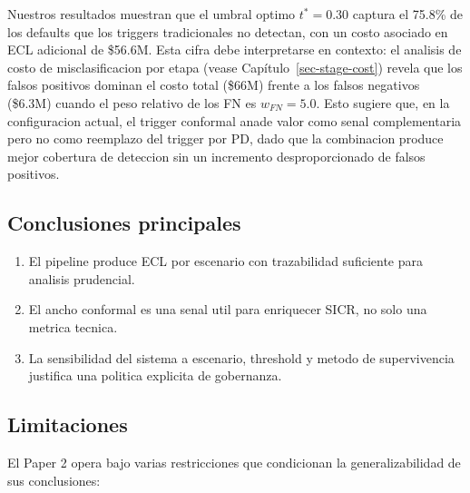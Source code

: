 \documentclass[
  spanish,
  11pt,
  letterpaper,
]{scrbook}
\providecommand{\tightlist}{%
  \setlength{\itemsep}{0pt}\setlength{\parskip}{0pt}}
\theoremstyle{plain}
\theoremstyle{remark}
\begin{document}
Nuestros resultados muestran que el umbral optimo \(t^* = 0.30\) captura
el 75.8\% de los defaults que los triggers tradicionales no detectan,
con un costo asociado en ECL adicional de \$56.6M. Esta cifra debe
interpretarse en contexto: el analisis de costo de misclasificacion por
etapa (vease Capítulo~\ref{sec-stage-cost}) revela que los falsos
positivos dominan el costo total (\$66M) frente a los falsos negativos
(\$6.3M) cuando el peso relativo de los FN es \(w_{FN} = 5.0\). Esto
sugiere que, en la configuracion actual, el trigger conformal anade
valor como senal complementaria pero no como reemplazo del trigger por
PD, dado que la combinacion produce mejor cobertura de deteccion sin un
incremento desproporcionado de falsos positivos.

\subsection{Conclusiones principales}\label{conclusiones-principales}

\begin{enumerate}
\def\labelenumi{\arabic{enumi}.}
\tightlist
\item
  El pipeline produce ECL por escenario con trazabilidad suficiente para
  analisis prudencial.
\item
  El ancho conformal es una senal util para enriquecer SICR, no solo una
  metrica tecnica.
\item
  La sensibilidad del sistema a escenario, threshold y metodo de
  supervivencia justifica una politica explicita de gobernanza.
\end{enumerate}

\subsection{Limitaciones}\label{sec-p2-limitations}

El Paper 2 opera bajo varias restricciones que condicionan la
generalizabilidad de sus conclusiones:
\end{document}
